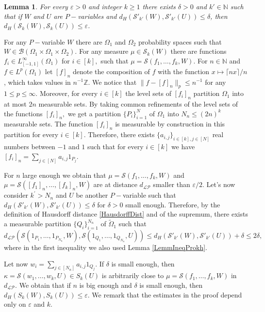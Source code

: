 \documentclass[11pt]{article}
\newtheorem{lemma}[theorem]{Lemma}
\def\N{\mathbb{N}}
\def\Z{\mathbb{Z}}
\newcommand{\cB}{{\mathcal B}}  %
\begin{document}
\begin{lemma}\label{LemmEquivForImplMetric}
For every $\varepsilon>0$ and integer $k\geq 1$ there exists $\delta>0$ and $k'\in\mathbb{N}$ such that if $W$ and $U$ are $P-$variables and $d_H(\mathcal{S}'_{k'}(W),\mathcal{S}'_{k'}(U))\leq\delta$, then $d_H(\mathcal{S}_k(W),\mathcal{S}_k(U))\leq\varepsilon$.
\end{lemma}
\proof
For any $P-$variable $W$ there are $\Omega_1$ and $\Omega_2$ probability spaces such that $W\in \cB(\Omega_1\times \Omega_1\times \Omega_2).$ For any measure $\mu\in\mathcal{S}_k(W)$ there are functions $f_i\in L^\infty_{[-1,1]}(\Omega_1)$ for $i\in [k],$  such that $\mu=\mathcal{S}(f_1,\ldots, f_k,W)$. For $n\in \N$ and $f\in L^p(\Omega_1)$ let $[f]_n$ denote the composition of $f$ with the function $x\mapsto \lceil nx\rceil/n$, which takes values in $n^{-1}\Z$. We notice that $\|f-[f]_n\|_p\leq n^{-1}$ for any $1\leq p \leq \infty$. Moreover, for every $i\in[k]$ the level sets of $[f_i]_n$ partition $\Omega_1$ into at most $2n$ measurable sets. By taking common refinements of the level sets of the functions $[f_i]_n,$ we get a partition $\{P_i\}_{i=1}^N$ of $\Omega_1$ into $N_n\leq (2n)^k$ measurable sets. The function $[f_i]_n$ is measurable by construction in this partition for every $i\in [k]$. Therefore, there exists $\{a_{i,j}\}_{i\in [k],j\in[N]}$ real numbers between $-1$ and $1$ such that for every $i\in[k]$ we have $[f_i]_n=\sum_{j\in [N]}a_{i,j}1_{P_j}$. 

For $n$ large enough we obtain that $\mu=\mathcal{S}(f_1,\ldots,f_k,W)$ and $\mu=\mathcal{S}([f_1]_n,\ldots,[f_k]_n,W)$ are at distance $d_{\mathcal{LP}}$ smaller than $\varepsilon/2.$ Let's now consider $k^{\prime}>N_n$ and $U$ be  another $P-$variable such that $d_H(\mathcal{S}'_{k'}(W),\mathcal{S}'_{k'}(U))\leq\delta$ for $\delta>0$ small enough. Therefore, by the definition of Hausdorff distance \ref{HausdorffDist} and of the supremum, there exists a measurable partition $\{Q_i\}_{i=1}^{{N_n}}$ of $\widetilde\Omega_1$ such that 
$d_{\mathcal{LP}}(\mathcal{S}(1_{P_1},\ldots,1_{P_{N_n}},W),\mathcal{S}(1_{Q_1},\ldots,1_{Q_{N_n}},U))\leq d_H(\mathcal{S}'_{k'}(W),\mathcal{S}'_{k'}(U))+\delta\leq 2\delta,$ where in the first inequality we also used Lemma \ref{LemmIneqProkh}.

Let now $w_i=\sum_{j\in [{N_n}]}a_{i,j}1_{Q_j}$. If $\delta$ is small enough, then $\kappa=\mathcal{S}(w_1,\ldots, w_k,U)\in S_k(U)$ is arbitrarily close to $\mu=\mathcal{S}(f_1,\ldots,f_k,W)$ in $d_{\mathcal{LP}}$. We obtain that if $n$ is big enough and $\delta$ is small enough, then $d_{H}(S_k(W),S_k(U))\leq \varepsilon$. We remark that the estimates in the proof depend only on $\varepsilon$ and $k$.
\endproof
\end{document}
